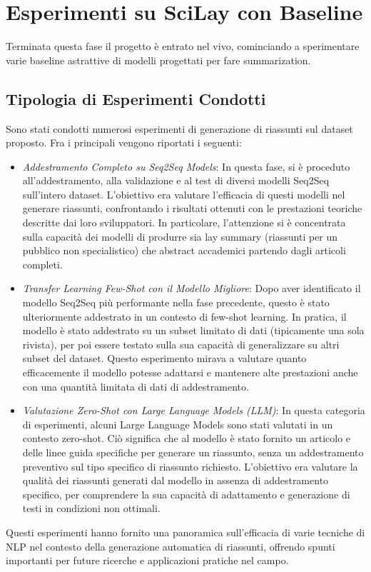\documentclass[12pt,a4paper,twoside,openright]{book}
\begin{document}
\section{Esperimenti su SciLay con Baseline}
Terminata questa fase il progetto è entrato nel vivo, cominciando a sperimentare varie baseline astrattive di modelli progettati per fare summarization.

\subsection{Tipologia di Esperimenti Condotti}
Sono stati condotti numerosi esperimenti di generazione di riassunti sul dataset proposto. Fra i principali vengono riportati i seguenti:
\begin{itemize}
    \item \emph{Addestramento Completo su Seq2Seq Models}: In questa fase, si è proceduto all'addestramento, alla validazione e al test di diversi modelli Seq2Seq sull'intero dataset. L'obiettivo era valutare l'efficacia di questi modelli nel generare riassunti, confrontando i risultati ottenuti con le prestazioni teoriche descritte dai loro sviluppatori. In particolare, l'attenzione si è concentrata sulla capacità dei modelli di produrre sia lay summary (riassunti per un pubblico non specialistico) che abstract accademici partendo dagli articoli completi.
    \item \emph{Transfer Learning Few-Shot con il Modello Migliore}: Dopo aver identificato il modello Seq2Seq più performante nella fase precedente, questo è stato ulteriormente addestrato in un contesto di few-shot learning. In pratica, il modello è stato addestrato su un subset limitato di dati (tipicamente una sola rivista), per poi essere testato sulla sua capacità di generalizzare su altri subset del dataset. Questo esperimento mirava a valutare quanto efficacemente il modello potesse adattarsi e mantenere alte prestazioni anche con una quantità limitata di dati di addestramento.
    \item \emph{Valutazione Zero-Shot con Large Language Models (LLM)}: In questa categoria di esperimenti, alcuni Large Language Models sono stati valutati in un contesto zero-shot. Ciò significa che al modello è stato fornito un articolo e delle linee guida specifiche per generare un riassunto, senza un addestramento preventivo sul tipo specifico di riassunto richiesto. L'obiettivo era valutare la qualità dei riassunti generati dal modello in assenza di addestramento specifico, per comprendere la sua capacità di adattamento e generazione di testi in condizioni non ottimali.
\end{itemize}
Questi esperimenti hanno fornito una panoramica sull'efficacia di varie tecniche di NLP nel contesto della generazione automatica di riassunti, offrendo spunti importanti per future ricerche e applicazioni pratiche nel campo.
\end{document}
